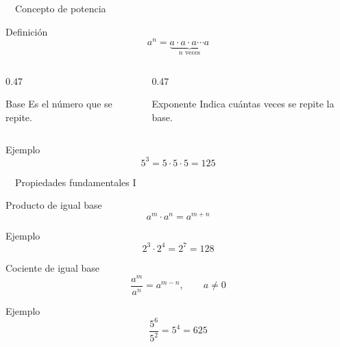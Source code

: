 \documentclass[aspectratio=169,10pt,handout]{beamer}
\newcommand{\pp}{\pause}
\newcommand{\iconoDesarrollo}{\faBrain}
\begin{document}
	\begin{frame}{\iconoDesarrollo\ \ Concepto de potencia}
		\begin{block}{Definición}
			\[
			a^n=\underbrace{a\cdot a\cdot a\cdots a}_{n\text{ veces}}
			\]
		\end{block}
		
		\pp
		
		\begin{columns}[T,totalwidth=\textwidth]
			\begin{column}{0.47\textwidth}
				\begin{block}{Base}
					Es el número que se repite.
				\end{block}
			\end{column}
			\begin{column}{0.47\textwidth}
				\begin{exampleblock}{Exponente}
					Indica cuántas veces se repite la base.
				\end{exampleblock}
			\end{column}
		\end{columns}
		
		\pp
		
		\begin{exampleblock}{Ejemplo}
			\[
			5^3=5\cdot5\cdot5=125
			\]
		\end{exampleblock}
	\end{frame}
	
	\begin{frame}{\iconoDesarrollo\ \ Propiedades fundamentales I}
		\begin{block}{Producto de igual base}
			\[
			a^m\cdot a^n=a^{m+n}
			\]
		\end{block}
		\begin{exampleblock}{Ejemplo}
			\[
			2^3\cdot2^4=2^7=128
			\]
		\end{exampleblock}
		
		\pp
		
		\begin{block}{Cociente de igual base}
			\[
			\frac{a^m}{a^n}=a^{m-n},\qquad a\neq0
			\]
		\end{block}
		\begin{exampleblock}{Ejemplo}
			\[
			\frac{5^6}{5^2}=5^4=625
			\]
		\end{exampleblock}
	\end{frame}
	
\end{document}
